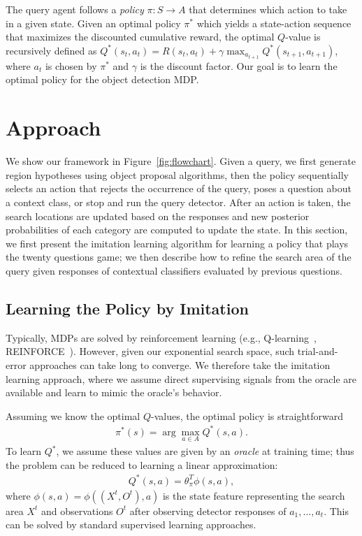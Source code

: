The query agent follows a
\textit{policy} $\pi: S \rightarrow A$ that determines which action to take in a
given state. 
Given an optimal policy $\pi^\ast$ which yields a state-action sequence that maximizes the discounted cumulative reward,
the optimal $Q$-value is recursively defined as $Q^\ast(s_t, a_t) = R(s_t, a_t) + \gamma\max_{a_{t+1}}Q^\ast(s_{t+1}, a_{t+1})$, where $a_t$ is chosen by $\pi^\ast$ and $\gamma$ is the discount factor.
Our goal is to learn the optimal policy for the object detection MDP.

\section{Approach}
We show our framework in Figure~\ref{fig:flowchart}.
Given a query, we first generate region hypotheses using object proposal algorithms, 
then the policy sequentially selects an action that rejects the occurrence of the query, poses a question about a context class, or stop and run the query detector. 
After an action is taken, the search locations are updated based on the responses and
new posterior probabilities of each category are computed to update the state.
In this section, we first present the imitation learning algorithm for learning a policy that plays the twenty questions game; 
we then describe how to refine the search area of the query given responses of contextual classifiers evaluated by previous questions.

\subsection{Learning the Policy by Imitation}
Typically, MDPs are solved by reinforcement learning (e.g., Q-learning~\cite{watkins1992q},
REINFORCE~\cite{williams1992simple}). However, given our exponential search space, such trial-and-error
approaches can take long to converge.
We therefore take the imitation learning approach, where we assume direct supervising
signals from the oracle are available and learn to mimic the oracle's
behavior.

Assuming we know the optimal $Q$-values, the optimal policy is
straightforward 
\begin{eqnarray}
\label{eq:pi}
\pi^\ast(s) = \arg\max_{a\in A} Q^\ast(s,a).
\end{eqnarray}
To learn $Q^\ast$, we assume these values are given
by an \emph{oracle} at training time; thus the
problem can be reduced to learning
a linear approximation:
\begin{eqnarray}
\label{eq:qvalue}
Q^{\ast}(s,a) = \theta_\pi^T \phi(s,a),
\end{eqnarray}
where $\phi(s,a) = \phi((X^t, O^t),a)$ is the state feature representing the search area $X^t$ and observations $O^t$ after observing detector responses of $a_1,...,a_t$. 
This can be solved by standard supervised learning approaches.

